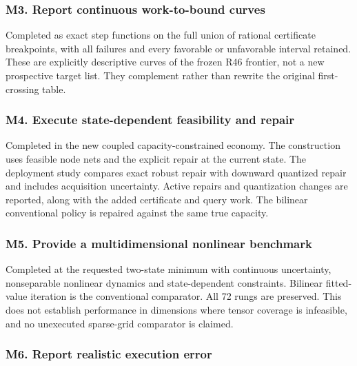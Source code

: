 \documentclass[ecta,nameyear,draft]{econsocart}
\begin{document}
\hypertarget{m3-report-continuous-work-to-bound-curves}{%
\subsubsection{M3. Report continuous work-to-bound
curves}\label{m3-report-continuous-work-to-bound-curves}}

Completed as exact step functions on the full union of rational
certificate breakpoints, with all failures and every favorable or
unfavorable interval retained. These are explicitly descriptive curves
of the frozen R46 frontier, not a new prospective target list. They
complement rather than rewrite the original first-crossing table.

\hypertarget{m4-execute-state-dependent-feasibility-and-repair}{%
\subsubsection{M4. Execute state-dependent feasibility and
repair}\label{m4-execute-state-dependent-feasibility-and-repair}}

Completed in the new coupled capacity-constrained economy. The
construction uses feasible node nets and the explicit repair at the
current state. The deployment study compares exact robust repair with
downward quantized repair and includes acquisition uncertainty. Active
repairs and quantization changes are reported, along with the added
certificate and query work. The bilinear conventional policy is repaired
against the same true capacity.

\hypertarget{m5-provide-a-multidimensional-nonlinear-benchmark}{%
\subsubsection{M5. Provide a multidimensional nonlinear
benchmark}\label{m5-provide-a-multidimensional-nonlinear-benchmark}}

Completed at the requested two-state minimum with continuous
uncertainty, nonseparable nonlinear dynamics and state-dependent
constraints. Bilinear fitted-value iteration is the conventional
comparator. All 72 rungs are preserved. This does not establish
performance in dimensions where tensor coverage is infeasible, and no
unexecuted sparse-grid comparator is claimed.

\hypertarget{m6-report-realistic-execution-error}{%
\subsubsection{M6. Report realistic execution
error}\label{m6-report-realistic-execution-error}}
\end{document}
